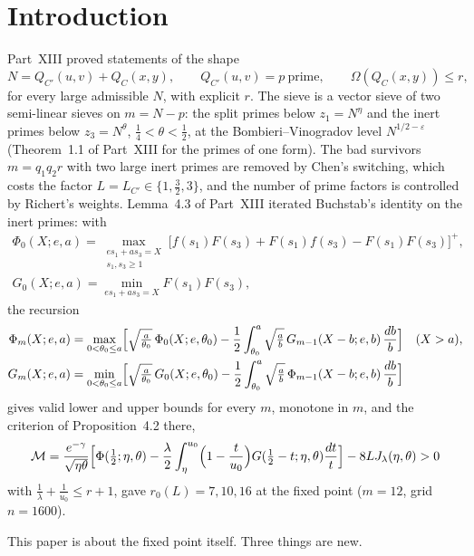 \documentclass[11pt]{amsart}
\theoremstyle{remark}
\newcommand{\e}{\varepsilon}
\newcommand{\cM}{\mathcal M}
\begin{document}
\section{Introduction}
Part~XIII \cite{ChenXIII} proved statements of the shape
\begin{equation}\label{eq:shape}
N=Q_{C'}(u,v)+Q_C(x,y),\qquad Q_{C'}(u,v)=p\ \text{prime},\qquad\Omega(Q_C(x,y))\le r,
\end{equation}
for every large admissible $N$, with explicit $r$. The sieve is a vector sieve of two semi-linear sieves on $m=N-p$: the split primes below $z_1=N^\eta$ and the inert primes below $z_3=N^\theta$, $\frac14<\theta<\frac12$, at the Bombieri--Vinogradov level $N^{1/2-\e}$ (Theorem~1.1 of Part~XIII for the primes of one form). The bad survivors $m=q_1q_2r$ with two large inert primes are removed by Chen's switching, which costs the factor $L=L_{C'}\in\{1,\frac32,3\}$, and the number of prime factors is controlled by Richert's weights. Lemma~4.3 of Part~XIII iterated Buchstab's identity on the inert primes: with
\begin{gather*}
\Phi_0(X;e,a)=\max_{\substack{es_1+as_3=X\\ s_1,s_3\ge1}}\bigl[f(s_1)F(s_3)+F(s_1)f(s_3)-F(s_1)F(s_3)\bigr]^+,\\
G_0(X;e,a)=\min_{es_1+as_3=X}F(s_1)F(s_3),
\end{gather*}
the recursion
\begin{align}
\Phi_m(X;e,a)&=\max_{0<\theta_0\le a}\Bigl[\sqrt{\tfrac a{\theta_0}}\,\Phi_0(X;e,\theta_0)-\frac12\int_{\theta_0}^{a}\sqrt{\tfrac ab}\,G_{m-1}(X-b;e,b)\,\frac{db}b\Bigr]\quad(X>a),\label{eq:recP}\\
G_m(X;e,a)&=\min_{0<\theta_0\le a}\Bigl[\sqrt{\tfrac a{\theta_0}}\,G_0(X;e,\theta_0)-\frac12\int_{\theta_0}^{a}\sqrt{\tfrac ab}\,\Phi_{m-1}(X-b;e,b)\,\frac{db}b\Bigr]\label{eq:recG}
\end{align}
gives valid lower and upper bounds for every $m$, monotone in $m$, and the criterion of Proposition~4.2 there,
\begin{equation}\label{eq:crit}
\cM=\frac{e^{-\gamma}}{\sqrt{\eta\theta}}\Bigl[\Phi(\tfrac12;\eta,\theta)-\frac\lambda2\int_\eta^{u_0}\Bigl(1-\frac t{u_0}\Bigr)G(\tfrac12-t;\eta,\theta)\frac{dt}t\Bigr]-8LJ_\lambda(\eta,\theta)>0
\end{equation}
with $\frac1\lambda+\frac1{u_0}\le r+1$, gave $r_0(L)=7,10,16$ at the fixed point ($m=12$, grid $n=1600$).

This paper is about the fixed point itself. Three things are new.
\end{document}
